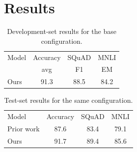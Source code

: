 \documentclass{article}
\begin{document}
\section{Results}

\begin{table}
\begin{tabular}{lccc}
Model & Accuracy & SQuAD & MNLI \\
 & avg & F1 & EM \\
\hline
Ours & 91.3 & 88.5 & 84.2 \\
\end{tabular}
\caption{Development-set results for the base configuration.}
\end{table}

\begin{table}
\begin{tabular}{lccc}
Model & Accuracy & SQuAD & MNLI \\
Prior work & 87.6 & 83.4 & 79.1 \\
Ours & 91.7 & 89.4 & 85.6 \\
\end{tabular}
\caption{Test-set results for the same configuration.}
\end{table}
\end{document}

